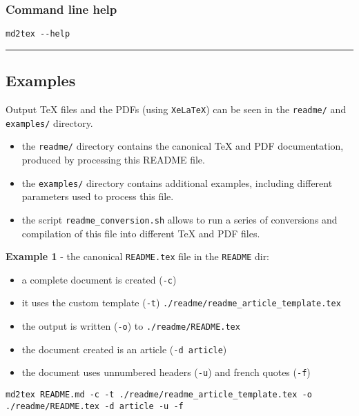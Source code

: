 \subsubsection{Command line help}

\begin{listing}[h!]
   \begin{verbatim}
md2tex --help

   \end{verbatim}
\end{listing}

\par\noindent\rule{\linewidth}{0.4pt}
\subsection{Examples}

Output TeX files and the PDFs (using \texttt{XeLaTeX}) can be seen in the \texttt{readme/} and \texttt{examples/} directory.

\begin{itemize}
\item the \texttt{readme/} directory contains the canonical TeX and PDF documentation, produced by processing this README file.
\item the \texttt{examples/} directory contains additional examples, including different parameters used to process this file.
\item the script \texttt{readme\_conversion.sh} allows to run a series of conversions and compilation of this file into different TeX and PDF files. 
\end{itemize}

\textbf{Example 1} - the canonical \texttt{README.tex} file in the \texttt{README} dir:

\begin{itemize}
\item a complete document is created (\texttt{-c})
\item it uses the custom template (\texttt{-t}) \texttt{./readme/readme\_article\_template.tex}
\item the output is written (\texttt{-o}) to \texttt{./readme/README.tex}
\item the document created is an article (\texttt{-d article})
\item the document uses unnumbered headers (\texttt{-u}) and french quotes (\texttt{-f}) 
\end{itemize}

\begin{listing}[h!]
   \begin{verbatim}
md2tex README.md -c -t ./readme/readme_article_template.tex -o ./readme/README.tex -d article -u -f

   \end{verbatim}
\end{listing}

